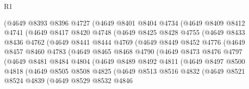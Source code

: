 \begin{lexlean}{R1}
\begin{coremodule}
            (@4649
              @8393
              @8396
              @4727
              (@4649
                @8401
                @8404
                @4734
                (@4649
                  @8409
                  @8412
                  @4741
                  (@4649
                    @8417
                    @8420
                    @4748
                    (@4649
                      @8425
                      @8428
                      @4755
                      (@4649
                        @8433
                        @8436
                        @4762
                        (@4649
                          @8441
                          @8444
                          @4769
                          (@4649
                            @8449
                            @8452
                            @4776
                            (@4649
                              @8457
                              @8460
                              @4783
                              (@4649
                                @8465
                                @8468
                                @4790
                                (@4649
                                  @8473
                                  @8476
                                  @4797
                                  (@4649
                                    @8481
                                    @8484
                                    @4804
                                    (@4649
                                      @8489
                                      @8492
                                      @4811
                                      (@4649
                                        @8497
                                        @8500
                                        @4818
                                        (@4649
                                          @8505
                                          @8508
                                          @4825
                                          (@4649
                                            @8513
                                            @8516
                                            @4832
                                            (@4649
                                              @8521
                                              @8524
                                              @4839
                                              (@4649
                                                @8529
                                                @8532
                                                @4846

\end{coremodule}
\end{lexlean}
